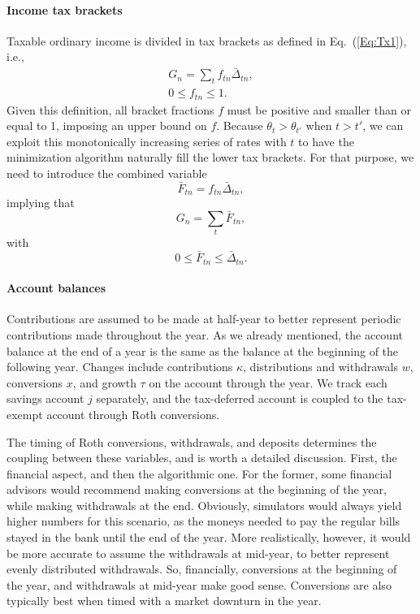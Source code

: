\documentclass{report}[fleqn,12pt]
\begin{document}
\paragraph*{Income tax brackets}
	Taxable ordinary income is divided in tax brackets as defined in Eq.~(\ref{Eq:Tx1}), i.e.,
	\begin{eqnarray}
		\label{Eq:C2}
		G_n = \sum_t f_{tn}\bar{\Delta}_{tn} ,\nonumber\\
		0 \leq f_{tn} \leq 1.
	\end{eqnarray}
	Given this definition, all bracket fractions $f$ must be positive and smaller than or equal to 1,
	imposing an upper bound on $f$.
	Because $\theta_{t} > \theta_{t'}$ when $t > t'$, we can exploit
	this monotonically increasing series of rates with $t$ to have the minimization
	algorithm naturally fill the lower tax brackets.
	For that purpose, we need to introduce the combined variable
	\begin{equation}
		\bar{F}_{tn} = f_{tn}\bar{\Delta}_{tn},
	\end{equation}
	implying that
	\begin{equation}
		G_n = \sum_t \bar{F}_{tn},
	\end{equation}
	with
	\begin{equation}
		0 \le \bar{F}_{tn} \le \bar{\Delta}_{tn}.
	\end{equation}

\paragraph*{Account balances}
	Contributions are assumed to be made at half-year to better represent periodic contributions
	made throughout the year. As we already mentioned,
	the account balance at the end of a year is the same as the balance
	at the beginning of the following year.
	Changes include contributions $\kappa$, distributions and withdrawals $w$,
	conversions $x$, and growth $\tau$ on the account through the year.
	We track each savings account $j$ separately, and the tax-deferred account
	is coupled to the tax-exempt account through Roth conversions.

	The timing of Roth conversions, withdrawals, and deposits determines
	the coupling between these variables, and is worth a detailed discussion.
	First, the financial aspect, and then the algorithmic one.
	For the former, some financial advisors would recommend making
	conversions at the beginning of the year, while making withdrawals
	at the end. Obviously, simulators would always yield higher numbers
	for this scenario, as the moneys needed to pay the regular bills 
	stayed in the bank until the end of the year. More realistically,
	however,
	it would be more accurate to assume the withdrawals at mid-year,
	to better represent evenly distributed withdrawals. So, financially,
	conversions at the beginning of the year, and withdrawals at mid-year
	make good sense. Conversions are also typically best when
	timed with a market downturn in the year.
\end{document}
